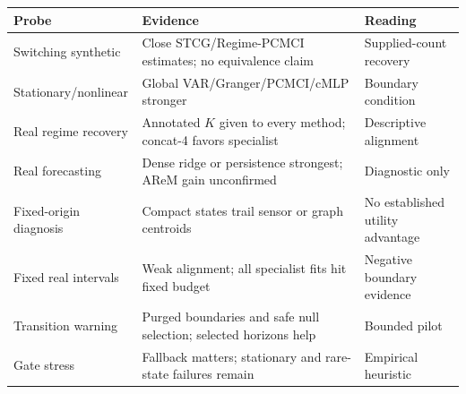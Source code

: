 \begin{tabular}{lll}
\toprule
Probe & Evidence & Reading \\
\midrule
Switching synthetic & Close STCG/Regime-PCMCI estimates; no equivalence claim & Supplied-count recovery \\
Stationary/nonlinear & Global VAR/Granger/PCMCI/cMLP stronger & Boundary condition \\
Real regime recovery & Annotated $K$ given to every method; concat-4 favors specialist & Descriptive alignment \\
Real forecasting & Dense ridge or persistence strongest; AReM gain unconfirmed & Diagnostic only \\
Fixed-origin diagnosis & Compact states trail sensor or graph centroids & No established utility advantage \\
Fixed real intervals & Weak alignment; all specialist fits hit fixed budget & Negative boundary evidence \\
Transition warning & Purged boundaries and safe null selection; selected horizons help & Bounded pilot \\
Gate stress & Fallback matters; stationary and rare-state failures remain & Empirical heuristic \\
\bottomrule
\end{tabular}
